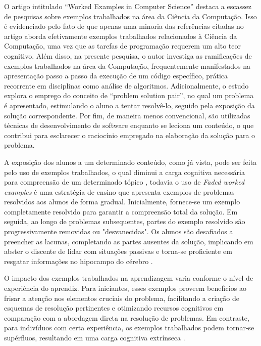 O artigo intitulado ``Worked Examples in Computer Science'' \cite{Skudder-LuxtonReilly:2014} destaca a escassez de pesquisas sobre exemplos trabalhados na área da Ciência da Computação. Isso é evidenciado pelo fato de que apenas uma minoria das referências citadas no artigo aborda efetivamente exemplos trabalhados relacionados à Ciência da Computação, uma vez que as tarefas de programação requerem um alto teor cognitivo. Além disso, na presente pesquisa, o autor investiga as ramificações de exemplos trabalhados na área da Computação, frequentemente manifestados na apresentação passo a passo da execução de um código específico, prática recorrente em disciplinas como análise de algoritmos. Adicionalmente, o estudo explora o emprego do conceito de ``problem solution pair'', no qual um problema é apresentado, estimulando o aluno a tentar resolvê-lo, seguido pela exposição da solução correspondente. Por fim, de maneira menos convencional, são utilizadas técnicas de desenvolvimento de software enquanto se leciona um conteúdo, o que contribui para esclarecer o raciocínio empregado na elaboração da solução para o problema.

A exposição dos alunos a um determinado conteúdo, como já vista, pode ser feita pelo uso de exemplos trabalhados, o qual diminui a carga cognitiva necessária para compreensão de um determinado tópico \cite{Robert.Atkinson-etal:2000}, todavia o uso de \textit{Faded worked examples} é uma estratégia de ensino que apresenta exemplos de problemas resolvidos aos alunos de forma gradual. Inicialmente, fornece-se um exemplo completamente resolvido para garantir a compreensão total da solução. Em seguida, ao longo de problemas subsequentes, partes do exemplo resolvido são progressivamente removidas ou "desvanecidas". Os alunos são desafiados a preencher as lacunas, completando as partes ausentes da solução, implicando em abster o discente de lidar com situações passivas e torna-se proficiente em resgatar informações no hipocampo do cérebro \cite{Skudder-LuxtonReilly:2014}.

O impacto dos exemplos trabalhados na aprendizagem varia conforme o nível de experiência do aprendiz. Para iniciantes, esses exemplos proveem benefícios ao frisar a atenção nos elementos cruciais do problema, facilitando a criação de esquemas de resolução pertinentes e otimizando recursos cognitivos em comparação com a abordagem direta na resolução de problemas. Em contraste, para indivíduos com certa experiência, os exemplos trabalhados podem tornar-se supérfluos, resultando em uma carga cognitiva extrínseca \cite{Skudder-LuxtonReilly:2014}.

